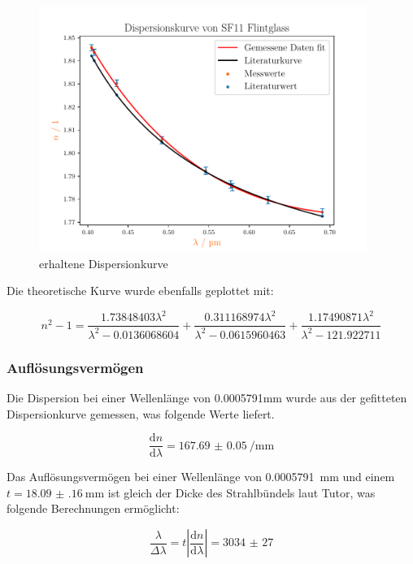 \documentclass[11pt,ngerman]{scrartcl}
\newcommand{\der}[2]{\frac{\mathrm{d}#1}{\mathrm{d}#2}}
\begin{document}
\begin{figure}[H]
	\begin{center}
		\includegraphics[width=0.95\textwidth]{./dispersion.pdf}
	\end{center}
	\caption{erhaltene Dispersionkurve}
	\label{fig:dispersionkurve}
\end{figure}

Die theoretische Kurve wurde ebenfalls geplottet mit:

\begin{equation}
	n^2-1=\frac{1.73848403\lambda^2}{\lambda^2-0.0136068604}+\frac{0.311168974\lambda^2}{\lambda^2-0.0615960463}+\frac{1.17490871\lambda^2}{\lambda^2-121.922711}
	\label{eq:theo_dispersionskurve}
\end{equation}


\subsubsection{Auflösungsvermögen}

Die Dispersion bei einer Wellenlänge von 0.0005791mm wurde aus der gefitteten Dispersionkurve gemessen, was folgende Werte liefert.

\begin{equation}
	\der{n}{\lambda}  = \SI{167.69(5)}{\per\mm}
	\label{eq:disperssionswert}
\end{equation}


Das Auflösungsvermögen bei einer Wellenlänge von \SI{0.0005791}{\mm} und einem $t=\SI{18.09(16)}{\mm}$ ist gleich der Dicke des Strahlbündels laut Tutor, was folgende Berechnungen ermöglicht:

\begin{equation}
	\frac{\lambda}{\Delta \lambda} = t \left| \der{n}{\lambda} \right|  = \num{3034(27)}
	\label{eq:auflosungprismawert}
\end{equation}
\end{document}
